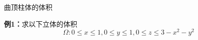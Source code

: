 \begin{frame}{曲顶柱体的体积}
	\linespread{1.2}
	\begin{exampleblock}{{\bf 例1：}求以下立体的体积\hfill}
		$$\Omega:0\leq x\leq 1,0\leq y\leq 1,0\leq z\leq
		3-x^2-y^2$$
	\end{exampleblock}\pause 
	\begin{center}
		\quad\pause 

\end{center}
\end{frame}

